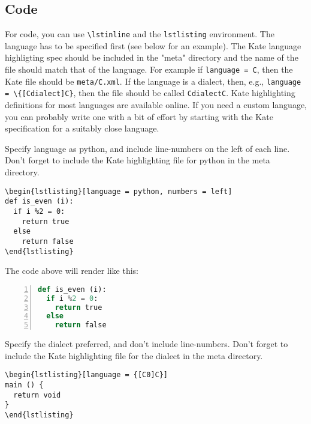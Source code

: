\subsection{Code}
\label{sec:mtl::code}
For code, you can use \lstinline`\lstinline` and the \lstinline`lstlisting` environment.  The language has to be specified first (see below for an example).  The Kate language highligting spec should be included in the "meta" directory and the name of the file should match that of the language.  For example if \lstinline`language = C`, then the Kate file should be \lstinline`meta/C.xml`.  If the language is a dialect, then, e.g., \lstinline`language = \{[Cdialect]C}`, then the file should be called \lstinline`CdialectC`.  
%
Kate highlighting definitions for most languages are available online.
%
If you need a custom language, you can probably write one with a bit of effort by starting with the Kate specification for a  suitably close language.

\begin{flex}
\begin{example}
Specify language as python, and include  line-numbers on the left of each line.
Don't forget to include the Kate highlighting file for python in the meta directory.

\begin{verbatim}
\begin{lstlisting}[language = python, numbers = left]
def is_even (i):
  if i %2 = 0:
    return true
  else 
    return false
\end{lstlisting}
\end{verbatim}
\end{example}

The code above will render like this:
%
\begin{lstlisting}[language = python, numbers = left]
def is_even (i):
  if i %2 = 0:
    return true
  else 
    return false
\end{lstlisting}
\end{flex}


\begin{example}
Specify the dialect preferred, and don't include line-numbers.
%
Don't forget to include the Kate highlighting file for the dialect in the meta directory.

\begin{verbatim}
\begin{lstlisting}[language = {[C0]C}]
main () {
  return void
}
\end{lstlisting}
\end{verbatim}
\end{example}
